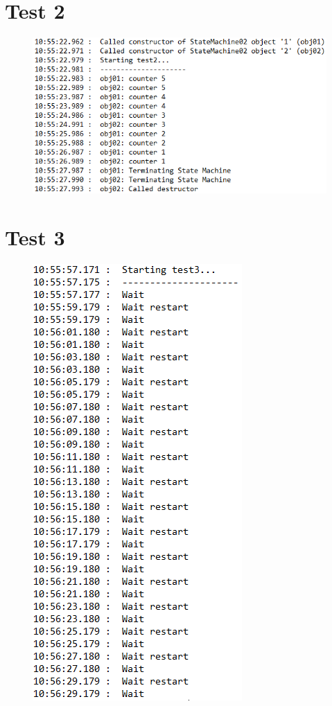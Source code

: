\documentclass[11pt,titlepage]{report}
\begin{document}
\section{Test 2}
\begin{figure}[H]
	\centering
	\includegraphics[]{Images/tests/test2.PNG}
\end{figure}

\section{Test 3}
\begin{figure}[H]
	\centering
	\includegraphics[]{Images/tests/test3.PNG}
\end{figure}
\end{document}
